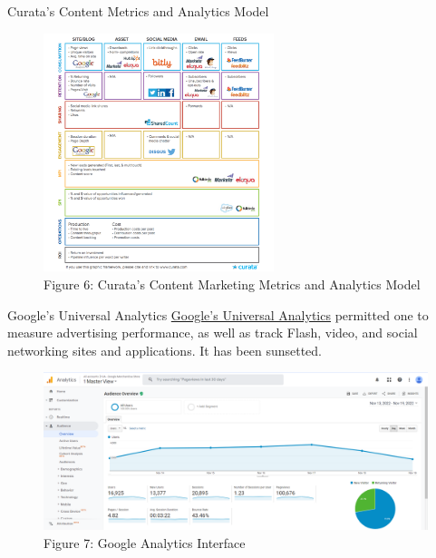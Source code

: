 \documentclass[pdf]{beamer}
\theoremstyle{remark}
\theoremstyle{definition}
\begin{document}
\begin{frame}[t]{Curata's Content Metrics and Analytics Model}
\begin{figure}[htbp]
    \centering
    \captionsetup{justification=centering}
    \includegraphics[clip, trim=0.0cm 0.0cm 0.0cm 0.0cm, width=0.60\textwidth]{Images/Figure_12_3.png}  
    \caption{Figure {\color{franklinblue} 6}:  Curata's Content Marketing Metrics and Analytics Model}
    \label{fig:curata}
\end{figure} 
\end{frame}

\begin{frame}[t]{Google's Universal Analytics}
\href{https://analytics.google.com/analytics/academy/}{Google's Universal Analytics} permitted one to measure advertising performance, as well as track Flash, video, and social networking sites and applications.  It has been sunsetted.\\
\vspace{1.5ex}
\begin{figure}[htbp]
    \centering
    \captionsetup{justification=centering}
    \includegraphics[clip, trim=0.0cm 0.0cm 0.0cm 0.0cm, width=1\textwidth]{Images/Google_Analytics.png}  
    \caption{Figure {\color{franklinblue} 7}:  Google Analytics Interface}
    \label{fig:googleanalytics}
\end{figure} 

\end{frame}
\end{document}
